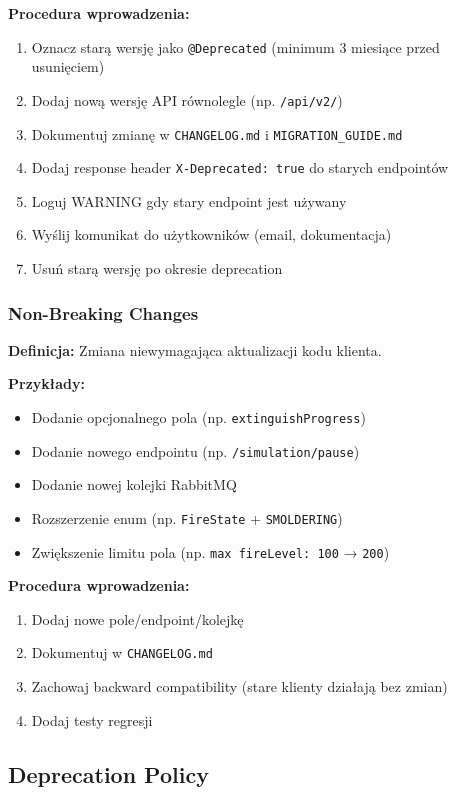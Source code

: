 \textbf{Procedura wprowadzenia:}
\begin{enumerate}
    \item Oznacz starą wersję jako \texttt{@Deprecated} (minimum 3 miesiące przed usunięciem)
    \item Dodaj nową wersję API równolegle (np. \texttt{/api/v2/})
    \item Dokumentuj zmianę w \texttt{CHANGELOG.md} i \texttt{MIGRATION\_GUIDE.md}
    \item Dodaj response header \texttt{X-Deprecated: true} do starych endpointów
    \item Loguj WARNING gdy stary endpoint jest używany
    \item Wyślij komunikat do użytkowników (email, dokumentacja)
    \item Usuń starą wersję po okresie deprecation
\end{enumerate}

\subsubsection{Non-Breaking Changes}

\textbf{Definicja:} Zmiana niewymagająca aktualizacji kodu klienta.

\textbf{Przykłady:}
\begin{itemize}
    \item Dodanie opcjonalnego pola (np. \texttt{extinguishProgress})
    \item Dodanie nowego endpointu (np. \texttt{/simulation/pause})
    \item Dodanie nowej kolejki RabbitMQ
    \item Rozszerzenie enum (np. \texttt{FireState} + \texttt{SMOLDERING})
    \item Zwiększenie limitu pola (np. \texttt{max fireLevel: 100} → \texttt{200})
\end{itemize}

\textbf{Procedura wprowadzenia:}
\begin{enumerate}
    \item Dodaj nowe pole/endpoint/kolejkę
    \item Dokumentuj w \texttt{CHANGELOG.md}
    \item Zachowaj backward compatibility (stare klienty działają bez zmian)
    \item Dodaj testy regresji
\end{enumerate}

\subsection{Deprecation Policy}


